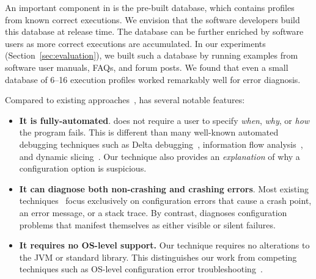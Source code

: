

An important component in \ourtool is the pre-built
database, which contains profiles
from known correct executions. We envision that 
the software developers build this database at release time.
The database can be
further enriched by software users as more correct
executions are accumulated. 
In our experiments (Section~\ref{sec:evaluation}), we
built such a database by running examples from software
user manuals, FAQs, and forum posts.  We
found that even a small database of 6--16 execution profiles worked remarkably
well for error diagnosis.

Compared to existing approaches~\cite{Zeller:2002:ICC, Zhang:2003:PDS,
Rabkin:2011:PPC, Whitaker:2004:CDS, Attariyan:2010:ACT, Wang:2004:AMT}, \ourtool has
several notable features:

\begin{itemize}
\item \textbf{It is fully-automated}.
\ourtool does not require a user to specify
\textit{when}, \textit{why}, or \textit{how} the program fails. This is
different than many well-known automated debugging techniques such
as Delta debugging~\cite{Zeller:2002:ICC}, information flow analysis~\cite{Attariyan:2010:ACT},
 and dynamic slicing~\cite{Zhang:2003:PDS}.
Our technique also provides an \emph{explanation} of
why a configuration option is suspicious. 

\item \textbf{It can diagnose both non-crashing and crashing errors}.
Most existing techniques~\cite{Rabkin:2011:PPC,
Whitaker:2004:CDS, Attariyan:2010:ACT, Su:2007:AIC} focus exclusively on configuration errors
that cause a crash point, an error message, or a stack trace.
By contrast, \ourtool diagnoses
configuration problems that manifest themselves as
either visible or silent failures.

\item \textbf{It requires no OS-level support.} Our technique requires no alterations to
the JVM or standard library. This distinguishes our work from
competing techniques such as OS-level configuration
error troubleshooting~\cite{Whitaker:2004:CDS, Su:2007:AIC}.%

\end{itemize}

